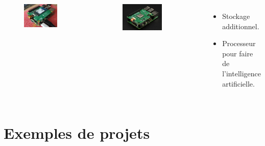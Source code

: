 \documentclass[aspectratio=169,xcolor=dvipsnames]{beamer}
\begin{document}
\begin{frame}
    \begin{columns}[c] %

        \begin{figure}
            \includegraphics[width=0.7\textwidth]{images/pcie_hat.jpg}
        \end{figure}
        \begin{figure}
            \includegraphics[width=0.7\textwidth]{images/pcie_ai_hat.jpg}
        \end{figure}

        \begin{itemize}
            \item Stockage additionnel.
            \item Processeur pour faire de l'intelligence artificielle.
        \end{itemize}

    \end{columns}
\end{frame}

\section{Exemples de projets}
\end{document}
